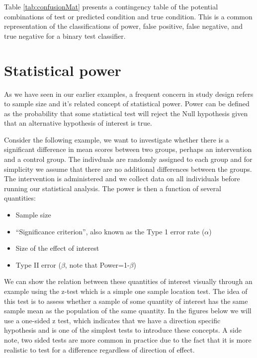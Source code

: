 \documentclass[]{book}
\providecommand{\tightlist}{%
  \setlength{\itemsep}{0pt}\setlength{\parskip}{0pt}}
\begin{document}
Table \ref{tab:confusionMat} presents a contingency table of the potential combinations of test or predicted condition and true condition. This is a common representation of the classifications of power, false positive, false negative, and true negative for a binary test classifier.

\hypertarget{statistical-power}{%
\section{Statistical power}\label{statistical-power}}

As we have seen in our earlier examples, a frequent concern in study design refers to sample size and it's related concept of statistical power. Power can be defined as the probability that some statistical test will reject the Null hypothesis given that an alternative hypothesis of interest is true.

Consider the following example, we want to investigate whether there is a significant difference in mean scores between two groups, perhaps an intervention and a control group. The indivduals are randomly assigned to each group and for simplicity we assume that there are no additional differences between the groups. The intervention is administered and we collect data on all individuals before running our statistical analysis. The power is then a function of several quantities:

\begin{itemize}
\tightlist
\item
  Sample size
\item
  ``Significance criterion'', also known as the Type 1 error rate (\(\alpha\))
\item
  Size of the effect of interest
\item
  Type II error (\(\beta\), note that Power=1-\(\beta\))
\end{itemize}

We can show the relation between these quantities of interest visually through an example using the z-test which is a simple one sample location test. The idea of this test is to assess whether a sample of some quantity of interest has the same sample mean as the population of the same quantity. In the figures below we will use a one-sided z test, which indicates that we have a direction specific hypothesis and is one of the simplest tests to introduce these concepts. A side note, two sided tests are more common in practice due to the fact that it is more realistic to test for a difference regardless of direction of effect.
\end{document}

